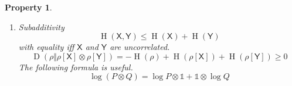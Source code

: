 \documentclass[aps,pra,onecolumn,notitlepage,superscriptaddress]{revtex4-1}
\newcommand{\reg}[1]{\mathsf{#1}}
\newcommand{\spc}[1]{\mathcal{#1}}
\newcommand{\D}{\mathsf{D}}
\newcommand{\Tr}{\operatorname{Tr}}
\newcommand{\op}[1]{\operatorname{#1}}
\newcommand\I{\mathds{1}}
\newtheorem{proper}{Property}
\begin{document}
\begin{proper}
\begin{enumerate}
            It suffices to prove $f$ is convex over $[0,1]$.
            \begin{align*}
                f'(x) 
                &= \lim_{\Delta x \to 0} \frac{\Delta f(x)}{\Delta x} \\
                &= -\Tr [(P-Q) \log (xP + (1-x)Q) + (P-Q)] \\
                f''(x) &= \lim_{\Delta x \to 0} \frac{\Delta f'(x)}{\Delta x} \\
                &= -\Tr [(P-Q) (xP+(1-x)Q)^{-1} (P-Q)] \\
                &\leq 0
            \end{align*}

            A third proof.
            Consider a classical-quantum state $\sigma \in \D(\spc X \otimes \spc Y)$:
            \begin{equation}
                \sigma = \sum_{a \in \Sigma} p(a) E_{a,a} \otimes \rho_a
            \end{equation}
            \begin{equation}
                \begin{cases}
                    \op H(\reg X) = \op H(p) \\
                    \op H(\reg Y) = \op H\left( \sum_{a \in \Sigma} p(a) \rho_a \right) \\
                    \op H(\reg X, \reg Y) = \op H(p) + \sum_{a \in \Sigma} p(a) \op H(\rho_a) \\
                    \op H(\reg X) + \op H(\reg Y) \geq \op H(\reg X, \reg Y)
                \end{cases}
                \implies \op H\left( \sum_{a \in \Sigma} p(a) \rho_a \right) \geq \sum_{a \in \Sigma} p(a) \op H(\rho_a)
            \end{equation}

            \item Subadditivity \label{Subadditivity}
            \begin{equation}
                \op H(\reg X, \reg Y) \leq \op H(\reg X) + \op H(\reg Y)
            \end{equation}
            with equality iff $\reg X$ and $\reg Y$ are uncorrelated.
            \begin{equation*}
                \op D(\rho \Vert \rho[\reg X] \otimes \rho[\reg Y]) = -\op H(\rho) + \op H(\rho[\reg X]) + \op H(\rho[\reg Y]) \geq 0
            \end{equation*}
            The following formula is useful.
            \begin{equation}
                \log (P \otimes Q) =  \log P \otimes \I + \I \otimes \log Q
            \end{equation}


\end{enumerate}
\end{proper}
\end{document}
